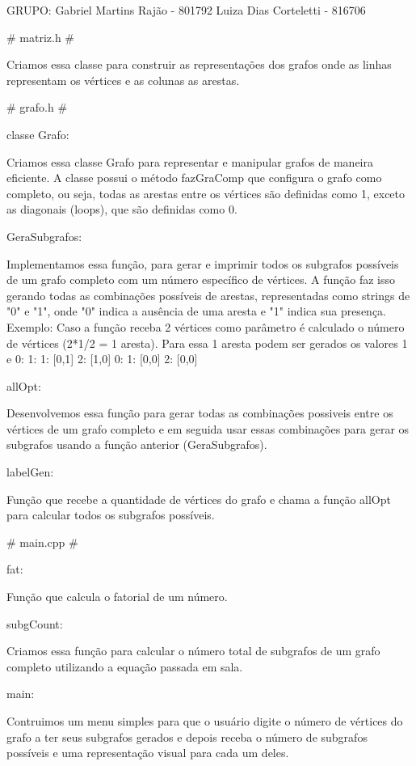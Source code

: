 GRUPO:
    Gabriel Martins Rajão - 801792
    Luiza Dias Corteletti - 816706

# matriz.h #

    Criamos essa classe para construir as representações dos grafos onde as linhas representam 
    os vértices e as colunas as arestas. 

# grafo.h #

    classe Grafo:

    Criamos essa classe Grafo para representar e manipular grafos de maneira eficiente. A classe
    possui o método fazGraComp que  configura o grafo como completo, ou seja, todas as arestas 
    entre os vértices são definidas como 1, exceto as diagonais (loops), que são definidas 
    como 0.

    GeraSubgrafos:

    Implementamos essa função, para gerar e imprimir todos os subgrafos possíveis de um grafo 
    completo com um número específico de vértices. A função faz isso gerando todas as 
    combinações possíveis de arestas, representadas como strings de "0" e "1", onde "0" indica 
    a ausência de uma aresta e "1" indica sua presença.
    Exemplo: Caso a função receba 2 vértices como parâmetro é calculado o número de vértices
    (2*1/2 = 1 aresta). Para essa 1 aresta podem ser gerados os valores 1 e 0:
    1: 
        1: [0,1]
        2: [1,0]
    0: 
        1: [0,0]
        2: [0,0]


    allOpt:

    Desenvolvemos essa função para gerar todas as combinações possiveis entre os vértices de um
    grafo completo e em seguida usar essas combinações para gerar os subgrafos usando a função
    anterior (GeraSubgrafos).
    
    labelGen:

    Função que recebe a quantidade de vértices do grafo e chama a função allOpt para calcular 
    todos os subgrafos possíveis. 

# main.cpp #

    fat:

    Função que calcula o fatorial de um número.

    subgCount:

    Criamos essa função para calcular o número total de subgrafos de um grafo completo 
    utilizando a equação passada em sala. 

    main:

    Contruimos um menu simples para que o usuário digite o número de vértices do grafo a ter 
    seus subgrafos gerados e depois receba o número de subgrafos possíveis e uma representação
    visual para cada um deles. 